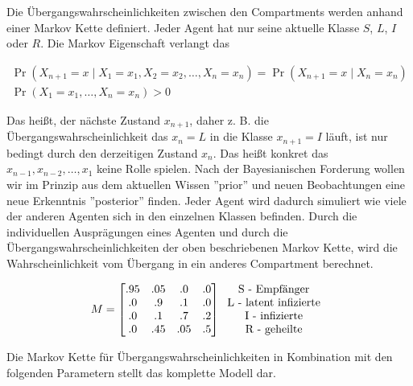 \documentclass[paper=a4, fontsize=11pt, ngerman, abstract=on]{scrartcl}
\numberwithin{equation}{section} %
\numberwithin{figure}{section} %
\numberwithin{table}{section} %
\begin{document}
Die Übergangswahrscheinlichkeiten zwischen den Compartments werden anhand einer Markov Kette definiert. Jeder Agent hat nur seine aktuelle Klasse $S$, $L$, $I$ oder $R$. Die Markov Eigenschaft verlangt das

\begin{gather*}
\Pr(X_{n+1}=x\mid X_{1}=x_{1},X_{2}=x_{2},\ldots ,X_{n}=x_{n})=\Pr(X_{n+1}=x\mid X_{n}=x_{n}) \\
\Pr(X_{1}=x_{1},\ldots,X_{n}=x_{n}) > 0
\end{gather*}

Das heißt, der nächste Zustand $x_{n + 1}$, daher z. B. die Übergangswahrscheinlichkeit das $x_{n} = L$ in die Klasse $x_{n + 1} = I$ läuft, ist nur bedingt durch den derzeitigen Zustand $x_{n}$. Das heißt konkret das $x_{n-1}, x_{n-2}, \ldots, x_{1}$ keine Rolle spielen. Nach der Bayesianischen Forderung wollen wir im Prinzip aus dem aktuellen Wissen ''prior'' und neuen Beobachtungen eine neue Erkenntnis ''posterior'' finden. Jeder Agent wird dadurch simuliert wie viele der anderen Agenten sich in den einzelnen Klassen befinden. Durch die individuellen Ausprägungen eines Agenten und durch die Übergangswahrscheinlichkeiten der oben beschriebenen Markov Kette, wird die Wahrscheinlichkeit vom Übergang in ein anderes Compartment berechnet.

\[
M=
  \begin{bmatrix}
    .95 & .05 & .0 & .0 \\
    .0 & .9 & .1 & .0 \\
    .0 & .1 & .7 & .2 \\
    .0 & .45 & .05 & .5 \\
  \end{bmatrix}
  \begin{tabular}{c}
    \text{S - Empfänger} \\
    \text{L - latent infizierte} \\
    \text{I - infizierte} \\
    \text{R - geheilte}
  \end{tabular}
\]

Die Markov Kette für Übergangswahrscheinlichkeiten in Kombination mit den folgenden Parametern stellt das komplette Modell dar.
\end{document}
